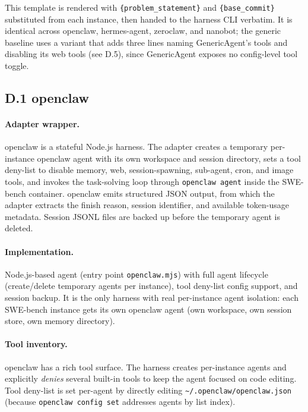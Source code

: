 \documentclass{llmxive}
\begin{document}
This template is rendered with \texttt{\{problem\_statement\}} and \texttt{\{base\_commit\}} substituted from each instance, then handed to the harness CLI verbatim. It is identical across openclaw, hermes-agent, zeroclaw, and nanobot; the generic baseline uses a variant that adds three lines naming GenericAgent's tools and disabling its web tools (see D.5), since GenericAgent exposes no config-level tool toggle.

\subsection*{D.1 openclaw}

\paragraph{Adapter wrapper.}
openclaw is a stateful Node.js harness. The adapter creates a temporary per-instance openclaw agent with its own workspace and session directory, sets a tool deny-list to disable memory, web, session-spawning, sub-agent, cron, and image tools, and invokes the task-solving loop through \texttt{openclaw agent} inside the SWE-bench container. openclaw emits structured JSON output, from which the adapter extracts the finish reason, session identifier, and available token-usage metadata. Session JSONL files are backed up before the temporary agent is deleted.


\paragraph{Implementation.}
Node.js-based agent (entry point \texttt{openclaw.mjs}) with full agent lifecycle (create/delete temporary agents per instance), tool deny-list config support, and session backup. It is the only harness with real per-instance agent isolation: each SWE-bench instance gets its own openclaw agent (own workspace, own session store, own memory directory).

\paragraph{Tool inventory.}
openclaw has a rich tool surface. The harness creates per-instance agents and explicitly \emph{denies} several built-in tools to keep the agent focused on code editing. Tool deny-list is set per-agent by directly editing \texttt{\textasciitilde/.openclaw/openclaw.json} (because \texttt{openclaw config set} addresses agents by list index).
\end{document}
